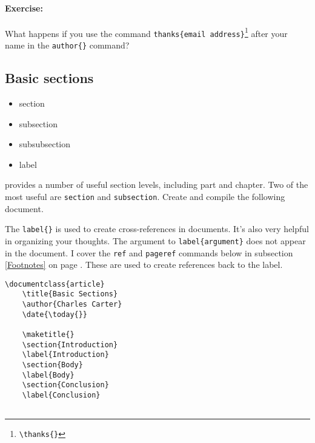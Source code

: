         \paragraph{Exercise:}What happens if you use the command \texttt{thanks\{email address\}}\footnote{\texttt{\textbackslash{}thanks\{\}}} after your name in the \texttt{author\{\}} command?

        \subsection{Basic sections}
        \label{Basic-sections}
        
        \begin{framed}
            \begin{itemize}
                \item{section}
                \item{subsection}
                \item{subsubsection}
                \item{label}
            \end{itemize}
        \end{framed}

        \LaTeXe{} provides a number of useful section levels, including part and chapter. Two of the most useful are \texttt{section} and \texttt{subsection}. Create and compile the following document. 

        The \texttt{label\{\}} is used to create cross-references in documents. It's also very helpful in organizing your thoughts. The argument to \texttt{label\{argument\}} does not appear in the document. I cover the \texttt{ref} and \texttt{pageref} commands below in subsection \ref{Footnotes} on page \pageref{Footnotes}. These are used to create references back to the label.

        \begin{verbatim}
\documentclass{article}
    \title{Basic Sections}
    \author{Charles Carter}
    \date{\today{}}
 
    \maketitle{}
    \section{Introduction}
    \label{Introduction}
    \section{Body}
    \label{Body}
    \section{Conclusion}
    \label{Conclusion}
    
        \end{verbatim}

